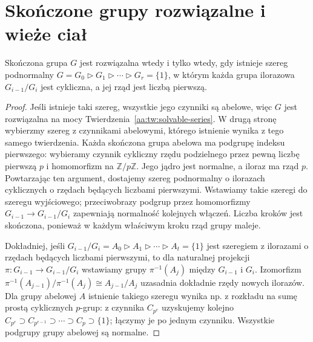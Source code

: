 \section{Skończone grupy rozwiązalne i wieże ciał}
\begin{lemat}
\label{aa:lem:solvable-prime-series}
Skończona grupa $G$ jest rozwiązalna wtedy i tylko wtedy,
gdy istnieje szereg podnormalny
$G=G_0\triangleright G_1\triangleright\cdots
\triangleright G_r=\{1\}$, w którym każda grupa
ilorazowa $G_{i-1}/G_i$ jest cykliczna, a jej rząd jest liczbą pierwszą.
\end{lemat}
\begin{proof}
Jeśli istnieje taki szereg, wszystkie jego czynniki
są abelowe, więc $G$ jest rozwiązalna na mocy
Twierdzenia~\ref{aa:tw:solvable-series}.
W drugą stronę wybierzmy szereg z czynnikami abelowymi,
którego istnienie wynika z tego samego twierdzenia.
Każda skończona grupa abelowa ma podgrupę indeksu
pierwszego: wybieramy czynnik cykliczny rzędu podzielnego
przez pewną liczbę pierwszą $p$ i homomorfizm na
$\mathbb Z/p\mathbb Z$. Jego jądro jest normalne,
a iloraz ma rząd $p$. Powtarzając ten argument,
dostajemy szereg podnormalny o ilorazach cyklicznych
o rzędach będących liczbami pierwszymi. Wstawiamy takie szeregi do szeregu
wyjściowego; przeciwobrazy podgrup przez homomorfizmy
$G_{i-1}\to G_{i-1}/G_i$ zapewniają normalność
kolejnych włączeń. Liczba kroków jest skończona,
ponieważ w każdym właściwym kroku rząd grupy maleje.

Dokładniej, jeśli $G_{i-1}/G_i=A_0\triangleright
A_1\triangleright\cdots\triangleright A_t=\{1\}$
jest szeregiem z ilorazami o rzędach będących liczbami pierwszymi, to dla
naturalnej projekcji $\pi:G_{i-1}\to G_{i-1}/G_i$
wstawiamy grupy $\pi^{-1}(A_j)$ między
$G_{i-1}$ i $G_i$. Izomorfizm
$\pi^{-1}(A_{j-1})/\pi^{-1}(A_j)\cong A_{j-1}/A_j$
uzasadnia dokładnie rzędy nowych ilorazów.
Dla grupy abelowej $A$ istnienie takiego szeregu
wynika np. z rozkładu na sumę prostą cyklicznych
$p$-grup: z czynnika $C_{p^e}$ uzyskujemy
kolejno $C_{p^e}\supset C_{p^{e-1}}\supset\cdots
\supset C_p\supset\{1\}$; łączymy je po jednym czynniku.
Wszystkie podgrupy grupy abelowej są normalne.
\end{proof}

